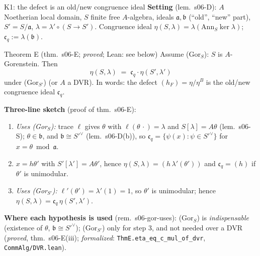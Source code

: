 \newcommand{\Ann}{\mathrm{Ann}}
\begin{frame}{K1: the defect is an old/new congruence ideal}
  \scriptsize
  \textbf{Setting} (lem.\ s06-D): $A$ Noetherian local domain, $S$ finite free $A$-algebra, ideals $\mathfrak a,\mathfrak b$ (``old'', ``new'' part), $S'=S/\mathfrak a$, $\lambda=\lambda'\circ(S\to S')$.
  Congruence ideal $\eta(S,\lambda)=\lambda(\Ann_S\ker\lambda)$; $\mathfrak c_q:=\lambda(\mathfrak b)$.
  \begin{block}{Theorem E (thm.\ s06-E; \emph{proved}; Lean: see below)}
    Assume (Gor$_S$): $S$ is $A$-Gorenstein. Then
    \[\eta(S,\lambda)\;=\;\mathfrak c_q\cdot\eta(S',\lambda')\]
    under (Gor$_{S'}$) (or $A$ a DVR). In words: the defect $(h_F)=\eta/\eta^B$ is the old/new congruence ideal $\mathfrak c_q$.
  \end{block}
  \textbf{Three-line sketch} (proof of thm.\ s06-E):
  \begin{enumerate}
    \item[1.] \emph{Uses (Gor$_S$):} trace $\ell$ gives $\theta$ with $\ell(\theta\,\cdot)=\lambda$ and $S[\lambda]=A\theta$ (lem.\ s06-S); $\theta\in\mathfrak b$, and $\mathfrak b\cong S'^\vee$ (lem.\ s06-D(b)), so $\mathfrak c_q=\{\psi(x):\psi\in S'^\vee\}$ for $x=\theta\bmod\mathfrak a$.
    \item[2.] $x=h\theta'$ with $S'[\lambda']=A\theta'$, hence $\eta(S,\lambda)=(h\,\lambda'(\theta'))$ and $\mathfrak c_q=(h)$ if $\theta'$ is unimodular.
    \item[3.] \emph{Uses (Gor$_{S'}$):} $\ell'(\theta')=\lambda'(1)=1$, so $\theta'$ is unimodular; hence $\eta(S,\lambda)=\mathfrak c_q\,\eta(S',\lambda')$.
  \end{enumerate}
  \textbf{Where each hypothesis is used} (rem.\ s06-gor-uses): (Gor$_S$) is \emph{indispensable} (existence of $\theta$, $\mathfrak b\cong S'^\vee$); (Gor$_{S'}$) only for step 3, and not needed over a DVR (\emph{proved}, thm.\ s06-E(iii); \emph{formalized}: \texttt{ThmE.eta\_eq\_c\_mul\_of\_dvr}, \texttt{CommAlg/DVR.lean}).


\end{frame}

